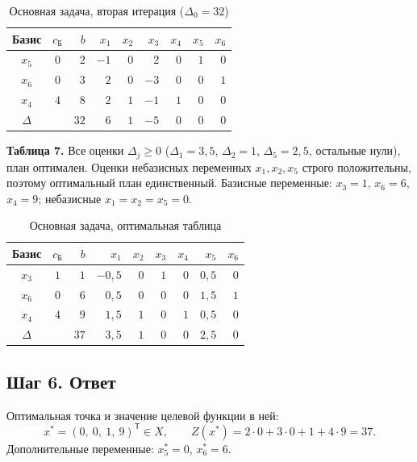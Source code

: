 \documentclass[a4paper,12pt]{article}
\begin{document}
\begin{table}[H]
\centering\small
\caption{Основная задача, вторая итерация ($\Delta_0 = 32$)}
\begin{tabular}{|c|c|r|r|r|r|r|r|r|}
\hline
Базис & $c_{\text{Б}}$ & $b$ & $x_{1}$ & $x_{2}$ & $x_{3}$ & $x_{4}$ & $x_{5}$ & $x_{6}$ \\ \hline
$x_{5}$ & $0$ & $2$ & $-1$ & $0$ & $\boxed{2}$ & $0$ & $1$ & $0$ \\
$x_{6}$ & $0$ & $3$ & $2$ & $0$ & $-3$ & $0$ & $0$ & $1$ \\
$x_{4}$ & $4$ & $8$ & $2$ & $1$ & $-1$ & $1$ & $0$ & $0$ \\
\hline
$\Delta$ & & $32$ & $6$ & $1$ & $-5$ & $0$ & $0$ & $0$ \\ \hline
\end{tabular}
\end{table}

\textbf{Таблица 7.} Все оценки $\Delta_j \ge 0$ ($\Delta_1 = 3{,}5$, $\Delta_2 = 1$, $\Delta_5 = 2{,}5$, остальные нули), план оптимален. Оценки небазисных переменных $x_1, x_2, x_5$ строго положительны, поэтому оптимальный план единственный. Базисные переменные: $x_3 = 1$, $x_6 = 6$, $x_4 = 9$; небазисные $x_1 = x_2 = x_5 = 0$.

\begin{table}[H]
\centering\small
\caption{Основная задача, оптимальная таблица}
\begin{tabular}{|c|c|r|r|r|r|r|r|r|}
\hline
Базис & $c_{\text{Б}}$ & $b$ & $x_{1}$ & $x_{2}$ & $x_{3}$ & $x_{4}$ & $x_{5}$ & $x_{6}$ \\ \hline
$x_{3}$ & $1$ & $1$ & $-0{,}5$ & $0$ & $1$ & $0$ & $0{,}5$ & $0$ \\
$x_{6}$ & $0$ & $6$ & $0{,}5$ & $0$ & $0$ & $0$ & $1{,}5$ & $1$ \\
$x_{4}$ & $4$ & $9$ & $1{,}5$ & $1$ & $0$ & $1$ & $0{,}5$ & $0$ \\
\hline
$\Delta$ & & $37$ & $3{,}5$ & $1$ & $0$ & $0$ & $2{,}5$ & $0$ \\ \hline
\end{tabular}
\end{table}

\subsection*{Шаг 6. Ответ}

Оптимальная точка и значение целевой функции в ней:
\[
x^* = (0,\ 0,\ 1,\ 9)^{\mathsf T} \in X, \qquad Z(x^*) = 2\cdot 0 + 3\cdot 0 + 1 + 4\cdot 9 = 37.
\]
Дополнительные переменные: $x_5^* = 0$, $x_6^* = 6$.
\end{document}
